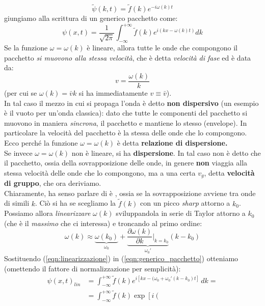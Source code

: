\documentclass[../../FisicaTeorica.tex]{subfiles}
\begin{document}
\begin{expl}
\[
\tilde{\psi}(k,t)=\tilde{f}(k)e^{-i\omega(k)t}
\]
giungiamo alla scrittura di un generico pacchetto come:
\begin{equation}
\psi(x,t)=\frac{1}{\sqrt{2\pi}}\int_{-\infty}^{+\infty}\tilde{f}(k) e^{i(kx-\omega(k)t)}dk
\label{eqn:generico_pacchetto}
\end{equation}
Se la funzione $\omega=\omega(k)$ è lineare, allora tutte le onde che compongono il pacchetto \textit{si muovono alla stessa velocità}, che è detta \textit{velocità di fase} ed è data da:
\[
v=\frac{\omega(k)}{k}
\]
(per cui se $\omega(k)=\bar{v}k$ si ha immediatamente $v\equiv \bar{v}$).\\
In tal caso il mezzo in cui si propaga l'onda è detto \textbf{non dispersivo} (un esempio è il vuoto per un'onda classica): dato che tutte le componenti del pacchetto si muovono in maniera \textit{sincrona}, il pacchetto  e mantiene lo stesso  (envelope). In particolare la velocità del pacchetto è la stessa delle onde che lo compongono. Ecco perché la funzione $\omega = \omega(k)$ è detta \textbf{relazione di dispersione.}\\
Se invece $\omega=\omega(k)$ non è lineare, si ha \textbf{dispersione}. In tal caso non è detto che il pacchetto, ossia  della sovrapposizione delle onde, in genere \textbf{non} viaggia alla stessa velocità delle onde che lo compongono, ma a una certa $v_g$, detta \textbf{velocità di gruppo}, che ora deriviamo.\\
Chiaramente, ha senso parlare di  è , ossia se la sovrapposizione avviene tra onde di simili $k$. Ciò si ha se scegliamo la $\tilde{f}(k)$ con un picco \textit{sharp} attorno a $k_0$. Possiamo allora \textit{linearizzare} $\omega(k)$ sviluppandola in serie di Taylor attorno a $k_0$ (che è il \textit{massimo} che ci interessa) e troncando al primo ordine:
\begin{equation}
\omega(k)\approx \underbrace{\omega(k_0)}_{\omega_0} + \underbrace{\frac{\partial \omega(k)}{\partial k}\Big|_{k=k_0}}_{\omega_0'}(k-k_0)
\label{eqn:linearizzazione}
\end{equation}
Sostituendo (\ref{eqn:linearizzazione}) in (\ref{eqn:generico_pacchetto}) otteniamo (omettendo il fattore di normalizzazione per semplicità):
\begin{align*}
\psi(x,t)_{lin}&=\int_{-\infty}^{+\infty}\tilde{f}(k)e^{i[kx-(\omega_0+\omega_0'(k-k_0)t]}\,dk=\\
&=\int_{-\infty}^{+\infty}\tilde{f}(k)\exp\left [i\left(

\end{align*}
\end{expl}
\end{document}
